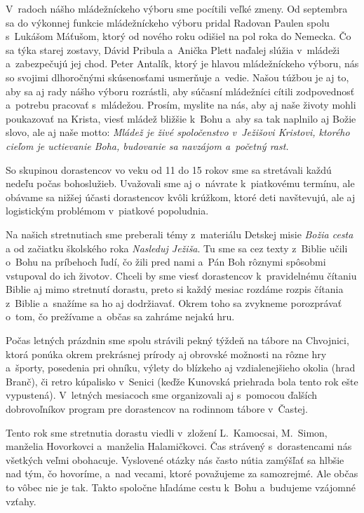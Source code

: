V~radoch nášho mládežníckeho výboru sme pocítili veľké zmeny. Od septembra sa do výkonnej funkcie mládežníckeho výboru pridal Radovan Paulen spolu s~Lukášom Máťušom, ktorý od nového roku odišiel na pol roka do Nemecka. Čo sa týka starej zostavy, Dávid Pribula a~Anička Plett naďalej slúžia v~mládeži a~zabezpečujú jej chod. Peter Antalík, ktorý je hlavou mládežníckeho výboru, nás so svojimi dlhoročnými skúsenosťami usmerňuje a~vedie.  Našou túžbou je aj to, aby sa aj rady nášho výboru rozrástli, aby súčasní mládežníci cítili zodpovednosť a~potrebu pracovať s~mládežou.  Prosím, myslite na nás, aby aj naše životy mohli poukazovať na Krista, viesť mládež bližšie k~Bohu a~aby sa tak naplnilo aj Božie slovo, ale aj naše motto: {\it Mládež je živé spoločenstvo v~Ježišovi Kristovi, ktorého cieľom je uctievanie Boha, budovanie sa navzájom a~početný rast.}



So skupinou dorastencov vo veku od 11 do 15 rokov sme sa stretávali každú nedeľu počas bohoslužieb. Uvažovali sme aj o~návrate k~piatkovému termínu, ale obávame sa nižšej účasti dorastencov kvôli krúžkom, ktoré deti navštevujú, ale aj logistickým problémom v~piatkové popoludnia.

Na našich stretnutiach sme preberali témy z~materiálu Detskej misie {\it Božia cesta} a od začiatku školského roka {\it Nasleduj Ježiša}. Tu sme sa cez texty z~Biblie učili o~Bohu na príbehoch ľudí, čo žili pred nami a~Pán Boh rôznymi spôsobmi vstupoval do ich životov. Chceli by sme viesť dorastencov k~pravidelnému čítaniu Biblie aj mimo stretnutí dorastu, preto si každý mesiac rozdáme rozpis čítania z~Biblie a~snažíme sa ho aj dodržiavať. Okrem toho sa zvykneme porozprávať o~tom, čo prežívame a~občas sa zahráme nejakú hru.

Počas letných prázdnin sme spolu strávili pekný týždeň na tábore na Chvojnici, ktorá ponúka okrem prekrásnej prírody aj obrovské možnosti na rôzne hry a~športy, posedenia pri ohníku, výlety do blízkeho aj vzdialenejšieho okolia (hrad Branč), či retro kúpalisko v~Senici (keďže Kunovská priehrada bola tento rok ešte vypustená). V~letných mesiacoch sme organizovali aj s~pomocou ďalších dobrovoľníkov program pre dorastencov na rodinnom tábore v~Častej.

Tento rok sme stretnutia dorastu viedli v~zložení L.~Kamocsai, M.~Simon, manželia Hovorkovci a~manželia Halamičkovci. Čas strávený s~dorastencami nás všetkých veľmi obohacuje. Vyslovené otázky nás často nútia zamýšľať sa hlbšie nad tým, čo hovoríme, a~nad vecami, ktoré považujeme za samozrejmé. Ale občas to vôbec nie je tak. Takto spoločne hľadáme cestu k~Bohu a~budujeme vzájomné vzťahy.

